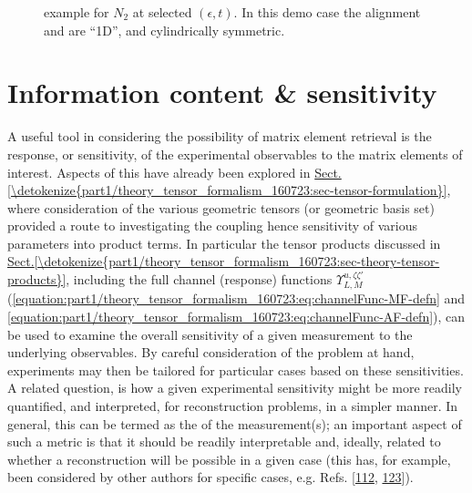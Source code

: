 \documentclass[letterpaper,table,10pt,english]{jupyterBook}
\begin{document}
\begin{figure}[htbp]
\centering
\capstart

\noindent{}
\caption{{\hyperref[\detokenize{backmatter/glossary:term-AF}]{}} example for \(N_2\) at selected \((\epsilon,t)\). In this demo case the alignment and {\hyperref[\detokenize{backmatter/glossary:term-PADs}]{}} are “1D”, and cylindrically symmetric.}\label{\detokenize{part1/theory_observables_intro_100723:fig-n2afpadsdemo}}\end{figure}

\sphinxstepscope


\section{Information content \& sensitivity}
\label{\detokenize{part1/theory_info_content_200723:information-content-sensitivity}}\label{\detokenize{part1/theory_info_content_200723:sec-info-content}}\label{\detokenize{part1/theory_info_content_200723::doc}}
\sphinxAtStartPar
A useful tool in considering the possibility of matrix element retrieval is the response, or sensitivity, of the experimental observables to the matrix elements of interest. Aspects of this have already been explored in \hyperref[\detokenize{part1/theory_tensor_formalism_160723:sec-tensor-formulation}]{Sect.\@ \ref{\detokenize{part1/theory_tensor_formalism_160723:sec-tensor-formulation}}}, where consideration of the various geometric tensors (or geometric basis set) provided a route to investigating the coupling \sphinxhyphen{} hence sensitivity \sphinxhyphen{} of various parameters into product terms. In particular the tensor products discussed in \hyperref[\detokenize{part1/theory_tensor_formalism_160723:sec-theory-tensor-products}]{Sect.\@ \ref{\detokenize{part1/theory_tensor_formalism_160723:sec-theory-tensor-products}}}, including the full channel (response) functions \(\varUpsilon_{L,M}^{u,\zeta\zeta'}\) (\eqref{equation:part1/theory_tensor_formalism_160723:eq:channelFunc-MF-defn} and \eqref{equation:part1/theory_tensor_formalism_160723:eq:channelFunc-AF-defn}), can be used to examine the overall sensitivity of a given measurement to the underlying observables. By careful consideration of the problem at hand, experiments may then be tailored for particular cases based on these sensitivities. A related question, is how a given experimental sensitivity might be more readily quantified, and interpreted, for reconstruction problems, in a simpler manner. In general, this can be termed as the  of the measurement(s); an important aspect of such a metric is that it should be readily interpretable and, ideally, related to whether a reconstruction will be possible in a given case (this has, for example, been considered by other authors for specific cases, e.g. Refs. {[}\hyperlink{cite.backmatter/bibliography:id833}{112}, \hyperlink{cite.backmatter/bibliography:id868}{123}{]}).
\end{document}
